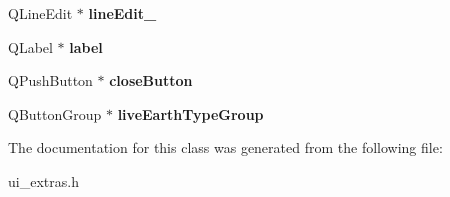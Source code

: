 \begin{DoxyCompactItemize}
\item 
\hypertarget{classUi__Extras_a6938f33168c2bb62d7b3ad3092391a3c}{
QLineEdit $\ast$ {\bfseries lineEdit\_}}
\label{classUi__Extras_a6938f33168c2bb62d7b3ad3092391a3c}

\item 
\hypertarget{classUi__Extras_a3c1aafcef167011e29b40fdf9b828d51}{
QLabel $\ast$ {\bfseries label}}
\label{classUi__Extras_a3c1aafcef167011e29b40fdf9b828d51}

\item 
\hypertarget{classUi__Extras_acf8277aeab1f7813505270ed0e7a5e60}{
QPushButton $\ast$ {\bfseries closeButton}}
\label{classUi__Extras_acf8277aeab1f7813505270ed0e7a5e60}

\item 
\hypertarget{classUi__Extras_a3b0e012edd2308486189a348211a84c6}{
QButtonGroup $\ast$ {\bfseries liveEarthTypeGroup}}
\label{classUi__Extras_a3b0e012edd2308486189a348211a84c6}

\end{DoxyCompactItemize}


The documentation for this class was generated from the following file:\begin{DoxyCompactItemize}
\item 
ui\_\-extras.h\end{DoxyCompactItemize}
